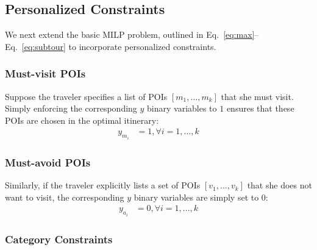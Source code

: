
\subsection{Personalized Constraints}
\label{sec:personalized}

We next extend the basic MILP problem, outlined in Eq.~\eqref{eq:max}--Eq.~\eqref{eq:subtour} to incorporate personalized constraints.

\subsubsection{\textbf{Must-visit POIs}}
\label{sec:must}

Suppose the traveler specifies a list of POIs $[m_1, \dots, m_k]$ that she
must visit.  Simply enforcing the corresponding $y$ binary variables to
$1$ ensures that these POIs are chosen in the optimal itinerary:
%
\begin{align}
	\label{eq:see}
	y_{m_i} & = 1, \forall i = 1, \dots, k
\end{align}

\subsubsection{\textbf{Must-avoid POIs}}
\label{sec:avoid}

Similarly, if the traveler explicitly lists a set of POIs $[v_1, \dots,
v_k]$ that she does not want to visit, the corresponding $y$ binary
variables are simply set to $0$:
%
\begin{align}
	\label{eq:avoid}
	y_{a_i} & = 0, \forall i = 1, \dots, k
\end{align}

\subsubsection{\textbf{Category Constraints}}
\label{sec:category}

